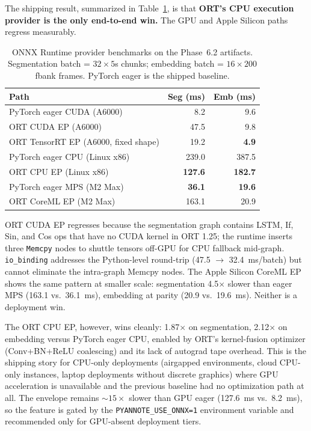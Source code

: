 \documentclass[conference,10pt]{IEEEtran}
\begin{document}
The shipping result, summarized in Table~\ref{tab:ort_providers}, is that
\textbf{ORT's CPU execution provider is the only end-to-end win.} The GPU
and Apple Silicon paths regress measurably.

\begin{table}[t]
\centering\small
\caption{ONNX Runtime provider benchmarks on the Phase~6.2 artifacts.
Segmentation batch = $32 \times 5$s chunks; embedding batch = $16 \times 200$
fbank frames. PyTorch eager is the shipped baseline.}
\label{tab:ort_providers}
\begin{tabular}{lrr}
\toprule
\textbf{Path} & \textbf{Seg (ms)} & \textbf{Emb (ms)} \\
\midrule
PyTorch eager CUDA (A6000) & 8.2 & 9.6 \\
ORT CUDA EP (A6000) & 47.5 & 9.8 \\
ORT TensorRT EP (A6000, fixed shape) & 19.2 & \textbf{4.9} \\
\midrule
PyTorch eager CPU (Linux x86) & 239.0 & 387.5 \\
ORT CPU EP (Linux x86) & \textbf{127.6} & \textbf{182.7} \\
\midrule
PyTorch eager MPS (M2 Max) & \textbf{36.1} & \textbf{19.6} \\
ORT CoreML EP (M2 Max) & 163.1 & 20.9 \\
\bottomrule
\end{tabular}
\end{table}

ORT CUDA EP regresses because the segmentation graph contains LSTM, If,
Sin, and Cos ops that have no CUDA kernel in ORT 1.25; the runtime inserts
three \texttt{Memcpy} nodes to shuttle tensors off-GPU for CPU fallback
mid-graph. \texttt{io\_binding} addresses the Python-level round-trip
(47.5 $\to$ 32.4~ms/batch) but cannot eliminate the intra-graph Memcpy nodes.
The Apple Silicon CoreML EP shows the same pattern at smaller scale:
segmentation 4.5$\times$ slower than eager MPS (163.1 vs.\ 36.1~ms), embedding
at parity (20.9 vs.\ 19.6~ms). Neither is a deployment win.

The ORT CPU EP, however, wins cleanly: 1.87$\times$ on segmentation,
2.12$\times$ on embedding versus PyTorch eager CPU, enabled by ORT's
kernel-fusion optimizer (Conv+BN+ReLU coalescing) and its lack of autograd
tape overhead. This is the shipping story for CPU-only deployments
(airgapped environments, cloud CPU-only instances, laptop deployments
without discrete graphics) where GPU acceleration is unavailable and the
previous baseline had no optimization path at all. The envelope remains
$\sim 15\times$ slower than GPU eager (127.6~ms vs.\ 8.2~ms), so the feature
is gated by the \texttt{PYANNOTE\_USE\_ONNX=1} environment variable and
recommended only for GPU-absent deployment tiers.
\end{document}
